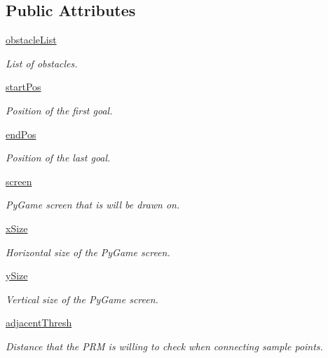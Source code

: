 \subsection*{Public Attributes}
\begin{DoxyCompactItemize}
\item 
\hyperlink{classprm_1_1PRMGenerator_a86b5b9254eb1e5f2c79fc32775c003e2}{obstacle\-List}
\begin{DoxyCompactList}\small\item\em List of obstacles. \end{DoxyCompactList}\item 
\hyperlink{classprm_1_1PRMGenerator_a784ce423bc47ebc7a09632948eb903eb}{start\-Pos}
\begin{DoxyCompactList}\small\item\em Position of the first goal. \end{DoxyCompactList}\item 
\hyperlink{classprm_1_1PRMGenerator_a8925b6d51130804d23bb82d3b8602d74}{end\-Pos}
\begin{DoxyCompactList}\small\item\em Position of the last goal. \end{DoxyCompactList}\item 
\hyperlink{classprm_1_1PRMGenerator_ab7fc7e3fa902029c3c3432ec0444be93}{screen}
\begin{DoxyCompactList}\small\item\em Py\-Game screen that is will be drawn on. \end{DoxyCompactList}\item 
\hyperlink{classprm_1_1PRMGenerator_a0cf38de489be01fc5ed01c1a59da8f0b}{x\-Size}
\begin{DoxyCompactList}\small\item\em Horizontal size of the Py\-Game screen. \end{DoxyCompactList}\item 
\hyperlink{classprm_1_1PRMGenerator_aaa5cf5ecddd099bf8c294cad0b33be92}{y\-Size}
\begin{DoxyCompactList}\small\item\em Vertical size of the Py\-Game screen. \end{DoxyCompactList}\item 
\hyperlink{classprm_1_1PRMGenerator_aa56ad4365534ffed0b4311c5accce577}{adjacent\-Thresh}
\begin{DoxyCompactList}\small\item\em Distance that the P\-R\-M is willing to check when connecting sample points. \end{DoxyCompactList}\item 

\end{DoxyCompactItemize}
